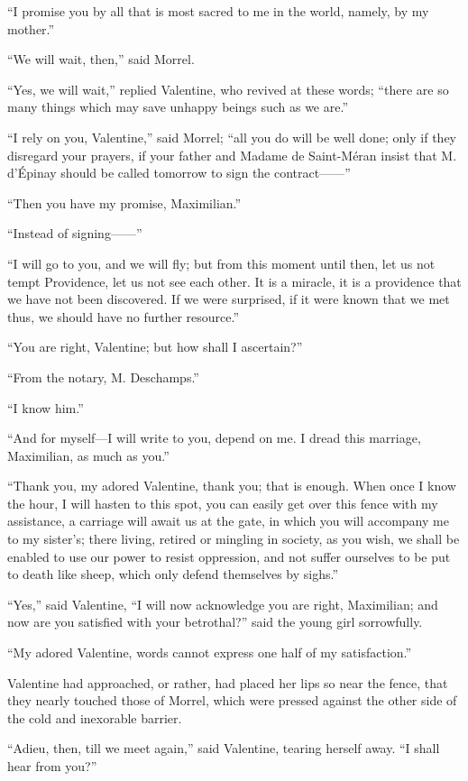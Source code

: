 “I promise you by all that is most sacred to me in the world, namely,
by my mother.”

“We will wait, then,” said Morrel.

“Yes, we will wait,” replied Valentine, who revived at these words;
“there are so many things which may save unhappy beings such as we
are.”

“I rely on you, Valentine,” said Morrel; “all you do will be well done;
only if they disregard your prayers, if your father and Madame de
Saint-Méran insist that M. d’Épinay should be called tomorrow to sign
the contract——”

“Then you have my promise, Maximilian.”

“Instead of signing——”

“I will go to you, and we will fly; but from this moment until then,
let us not tempt Providence, let us not see each other. It is a
miracle, it is a providence that we have not been discovered. If we
were surprised, if it were known that we met thus, we should have no
further resource.”

“You are right, Valentine; but how shall I ascertain?”

“From the notary, M. Deschamps.”

“I know him.”

“And for myself—I will write to you, depend on me. I dread this
marriage, Maximilian, as much as you.”

“Thank you, my adored Valentine, thank you; that is enough. When once I
know the hour, I will hasten to this spot, you can easily get over this
fence with my assistance, a carriage will await us at the gate, in
which you will accompany me to my sister’s; there living, retired or
mingling in society, as you wish, we shall be enabled to use our power
to resist oppression, and not suffer ourselves to be put to death like
sheep, which only defend themselves by sighs.”

“Yes,” said Valentine, “I will now acknowledge you are right,
Maximilian; and now are you satisfied with your betrothal?” said the
young girl sorrowfully.

“My adored Valentine, words cannot express one half of my
satisfaction.”

Valentine had approached, or rather, had placed her lips so near the
fence, that they nearly touched those of Morrel, which were pressed
against the other side of the cold and inexorable barrier.

“Adieu, then, till we meet again,” said Valentine, tearing herself
away. “I shall hear from you?”

